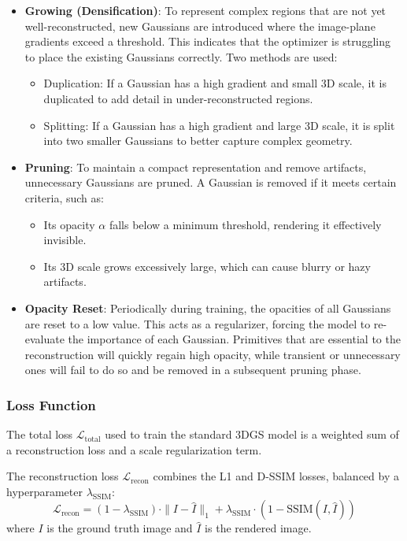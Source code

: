 \begin{itemize}
	\item \textbf{Growing (Densification)}:
	      To represent complex regions that are not yet well-reconstructed, new Gaussians are introduced where the image-plane gradients exceed a threshold. This indicates that the optimizer is struggling to place the existing Gaussians correctly. Two methods are used:
	      \begin{itemize}
		      \item Duplication: If a Gaussian has a high gradient and small 3D scale, it is duplicated to add detail in under-reconstructed regions.
		      \item Splitting: If a Gaussian has a high gradient and large 3D scale, it is split into two smaller Gaussians to better capture complex geometry.
	      \end{itemize}

	\item \textbf{Pruning}:
	      To maintain a compact representation and remove artifacts, unnecessary Gaussians are pruned. A Gaussian is removed if it meets certain criteria, such as:
	      \begin{itemize}
		      \item Its opacity $\alpha$ falls below a minimum threshold, rendering it effectively invisible.
		      \item Its 3D scale grows excessively large, which can cause blurry or hazy artifacts.
	      \end{itemize}

	\item \textbf{Opacity Reset}:
	      Periodically during training, the opacities of all Gaussians are reset to a low value. This acts as a regularizer, forcing the model to re-evaluate the importance of each Gaussian. Primitives that are essential to the reconstruction will quickly regain high opacity, while transient or unnecessary ones will fail to do so and be removed in a subsequent pruning phase.
\end{itemize}

\subsubsection{Loss Function}
The total loss $\mathcal{L}_{\text{total}}$ used to train the standard 3DGS model is a weighted sum of a reconstruction loss and a scale regularization term.

The reconstruction loss $\mathcal{L}_{\text{recon}}$ combines the L1 and D-SSIM losses, balanced by a hyperparameter $\lambda_{\text{SSIM}}$:
\begin{equation}
	\mathcal{L}_{\text{recon}} = (1 - \lambda_{\text{SSIM}}) \cdot \|I - \hat{I}\|_1 + \lambda_{\text{SSIM}} \cdot \left(1 - \text{SSIM}(I, \hat{I})\right)
\end{equation}
where $I$ is the ground truth image and $\hat{I}$ is the rendered image.


